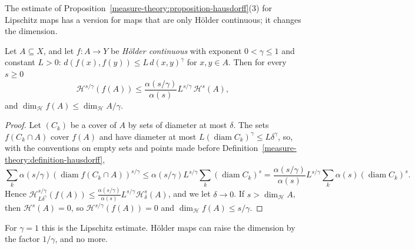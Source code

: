 The estimate of Proposition~\ref{measure-theory:proposition-hausdorff}(3) for Lipschitz maps has a version for maps that are only H\"older continuous; it changes the dimension.

\begin{proposition}\label{measure-theory:proposition-holder-images}
Let $A \subseteq X$, and let $f \colon A \to Y$ be \emph{H\"older continuous} with exponent $0 < \gamma \leq 1$ and constant $L > 0$: $d(f(x), f(y)) \leq L\,d(x, y)^\gamma$ for $x, y \in A$. Then for every $s \geq 0$
\[
\mathcal{H}^{s/\gamma}(f(A)) \leq \frac{\alpha(s/\gamma)}{\alpha(s)}L^{s/\gamma}\,\mathcal{H}^s(A),
\]
and $\dim_{\mathcal{H}}f(A) \leq \dim_{\mathcal{H}}A/\gamma$.
\end{proposition}

\begin{proof}
Let $(C_k)$ be a cover of $A$ by sets of diameter at most $\delta$. The sets $f(C_k \cap A)$ cover $f(A)$ and have diameter at most $L(\operatorname{diam}C_k)^\gamma \leq L\delta^\gamma$, so, with the conventions on
empty sets and points made before Definition~\ref{measure-theory:definition-hausdorff},
\[
\sum_k\alpha(s/\gamma)(\operatorname{diam}f(C_k \cap A))^{s/\gamma} \leq \alpha(s/\gamma)L^{s/\gamma}\sum_k(\operatorname{diam}C_k)^s = \frac{\alpha(s/\gamma)}{\alpha(s)}L^{s/\gamma}\sum_k\alpha(s)(\operatorname{diam}C_k)^s .
\]
Hence $\mathcal{H}^{s/\gamma}_{L\delta^\gamma}(f(A)) \leq \frac{\alpha(s/\gamma)}{\alpha(s)}L^{s/\gamma}\mathcal{H}^s_\delta(A)$, and we let $\delta \to 0$. If $s > \dim_{\mathcal{H}}A$, then $\mathcal{H}^s(A) = 0$, so
$\mathcal{H}^{s/\gamma}(f(A)) = 0$ and $\dim_{\mathcal{H}}f(A) \leq s/\gamma$.
\end{proof}

For $\gamma = 1$ this is the Lipschitz estimate. H\"older maps can raise the dimension by the factor $1/\gamma$, and no more.

